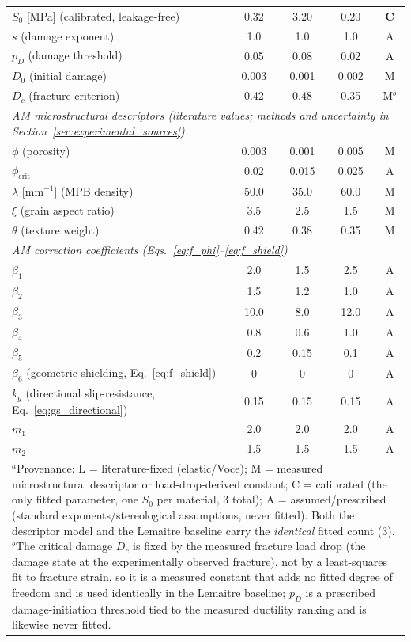 \documentclass[twocolumn]{sagej}
\begin{document}
\begin{table}[htbp]
{\begin{tabular}{lcccc}
$S_0$ [MPa] (calibrated, leakage-free) & 0.32 & 3.20 & 0.20 & \textbf{C} \\
$s$ (damage exponent) & 1.0 & 1.0 & 1.0 & A \\
$p_D$ (damage threshold) & 0.05 & 0.08 & 0.02 & A \\
$D_0$ (initial damage) & 0.003 & 0.001 & 0.002 & M \\
$D_c$ (fracture criterion) & 0.42 & 0.48 & 0.35 & M$^{b}$ \\
\midrule
\multicolumn{5}{l}{\emph{AM microstructural descriptors (literature values; methods and uncertainty in Section~\ref{sec:experimental_sources})}} \\
$\phi$ (porosity) & 0.003 & 0.001 & 0.005 & M \\
$\phi_{\mathrm{crit}}$ & 0.02 & 0.015 & 0.025 & A \\
$\lambda$ [mm$^{-1}$] (MPB density) & 50.0 & 35.0 & 60.0 & M \\
$\xi$ (grain aspect ratio) & 3.5 & 2.5 & 1.5 & M \\
$\theta$ (texture weight) & 0.42 & 0.38 & 0.35 & M \\
\midrule
\multicolumn{5}{l}{\emph{AM correction coefficients (Eqs.~\eqref{eq:f_phi}--\eqref{eq:f_shield})}} \\
$\beta_1$ & 2.0 & 1.5 & 2.5 & A \\
$\beta_2$ & 1.5 & 1.2 & 1.0 & A \\
$\beta_3$ & 10.0 & 8.0 & 12.0 & A \\
$\beta_4$ & 0.8 & 0.6 & 1.0 & A \\
$\beta_5$ & 0.2 & 0.15 & 0.1 & A \\
$\beta_6$ (geometric shielding, Eq.~\eqref{eq:f_shield}) & 0 & 0 & 0 & A \\
$k_g$ (directional slip-resistance, Eq.~\eqref{eq:gs_directional}) & 0.15 & 0.15 & 0.15 & A \\
$m_1$ & 2.0 & 2.0 & 2.0 & A \\
$m_2$ & 1.5 & 1.5 & 1.5 & A \\
\bottomrule
\multicolumn{5}{p{0.97\textwidth}}{\footnotesize $^{a}$Provenance: L = literature-fixed (elastic/Voce); M = measured microstructural descriptor or load-drop-derived constant; C = calibrated (the only fitted parameter, one $S_0$ per material, 3 total); A = assumed/prescribed (standard exponents/stereological assumptions, never fitted). Both the descriptor model and the Lemaitre baseline carry the \emph{identical} fitted count (3). $^{b}$The critical damage $D_c$ is fixed by the measured fracture load drop (the damage state at the experimentally observed fracture), not by a least-squares fit to fracture strain, so it is a measured constant that adds no fitted degree of freedom and is used identically in the Lemaitre baseline; $p_D$ is a prescribed damage-initiation threshold tied to the measured ductility ranking and is likewise never fitted.} \\
\end{tabular}%
}
\end{table}
\end{document}
